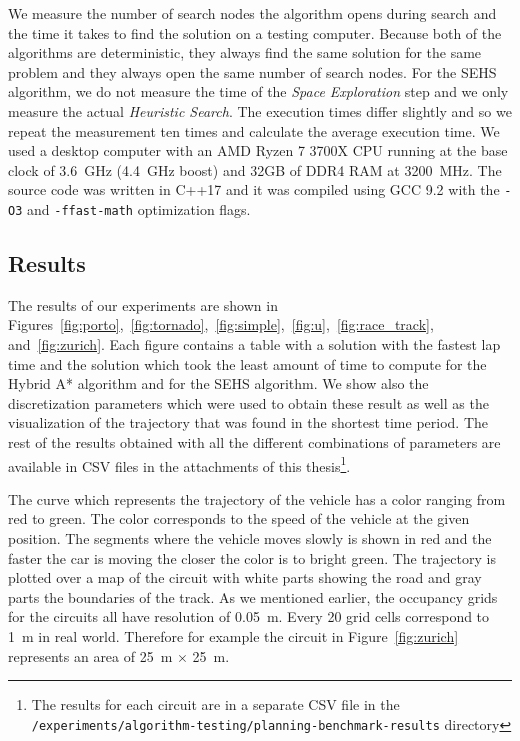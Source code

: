 We measure the number of search nodes the algorithm opens during search and the time it takes to find the solution on a testing computer. Because both of the algorithms are deterministic, they always find the same solution for the same problem and they always open the same number of search nodes. For the SEHS algorithm, we do not measure the time of the \textit{Space Exploration} step and we only measure the actual \textit{Heuristic Search}. The execution times differ slightly and so we repeat the measurement ten times and calculate the average execution time. We used a desktop computer with an AMD Ryzen 7 3700X CPU running at the base clock of \SI{3.6}{\giga\hertz} (\SI{4.4}{\giga\hertz} boost) and \num{32}GB of DDR4 RAM at \SI{3200}{\mega\hertz}. The source code was written in C++17 and it was compiled using GCC 9.2 with the \texttt{-O3} and \texttt{-ffast-math} optimization flags.

\subsection{Results}

The results of our experiments are shown in Figures~\ref{fig:porto},~\ref{fig:tornado},~\ref{fig:simple},~\ref{fig:u},~\ref{fig:race_track}, and~\ref{fig:zurich}. Each figure contains a table with a solution with the fastest lap time and the solution which took the least amount of time to compute for the Hybrid A* algorithm and for the \gls{SEHS} algorithm. We show also the discretization parameters which were used to obtain these result as well as the visualization of the trajectory that was found in the shortest time period. The rest of the results obtained with all the different combinations of parameters are available in CSV files in the attachments of this thesis\footnote{The results for each circuit are in a separate CSV file in the \texttt{/experiments/\-algorithm-testing/\-planning-benchmark-results} directory}.

The curve which represents the trajectory of the vehicle has a color ranging from red to green. The color corresponds to the speed of the vehicle at the given position. The segments where the vehicle moves slowly is shown in red and the faster the car is moving the closer the color is to bright green. The trajectory is plotted over a map of the circuit with white parts showing the road and gray parts the boundaries of the track. As we mentioned earlier, the occupancy grids for the circuits all have resolution of \SI{0.05}{\meter}. Every \num{20} grid cells correspond to \SI{1}{\meter} in real world. Therefore for example the circuit in Figure~\ref{fig:zurich} represents an area of \SI{25}{\meter} $\times$ \SI{25}{\meter}.

